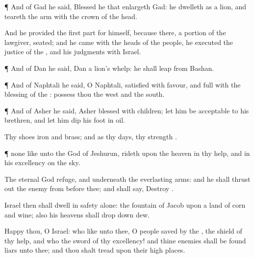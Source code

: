 {\par }{\PP {}¶ And of
Gad he
said,
Blessed
{} he that
enlargeth
Gad: he
dwelleth as a
lion, and
teareth the
arm
with the crown of the
head.

And he
provided the first
part for himself, because there,
{} a
portion of the
lawgiver,
{}
seated; and he
came with the
heads of the
people, he
executed the
justice of the
{}, and his
judgments with
Israel.


\par }{\PP {}¶ And of
Dan he
said,
Dan
{} a
lion’s
whelp: he shall
leap from
Bashan.


\par }{\PP {}¶ And of
Naphtali he
said, O
Naphtali,
satisfied with
favour, and
full with the
blessing of the
{}:
possess thou the
west and the
south.


\par }{\PP {}¶ And of
Asher he
said,
{}
Asher
{}
blessed with
children; let him be
acceptable to his
brethren, and let him
dip his
foot in
oil.

Thy
shoes
{}
iron and
brass; and as thy
days,
{} thy
strength
{}.


\par }{\PP {}¶
{} none like unto the
God of
Jeshurun,
{}
rideth upon the
heaven in thy
help, and in his
excellency on the
sky.

The
eternal
God
{}
refuge, and underneath
{} the
everlasting
arms: and he shall thrust
out the
enemy from
before thee; and shall
say,
Destroy
{}.

Israel then shall
dwell in
safety
alone: the
fountain of
Jacob
{} upon a
land of
corn and
wine; also his
heavens shall drop
down
dew.

Happy
{} thou, O
Israel: who
{} like unto thee, O
people
saved by the
{}, the
shield of thy
help, and who
{} the
sword of thy
excellency! and thine
enemies shall be found
liars unto thee; and thou shalt
tread upon their high
places.




\par }
